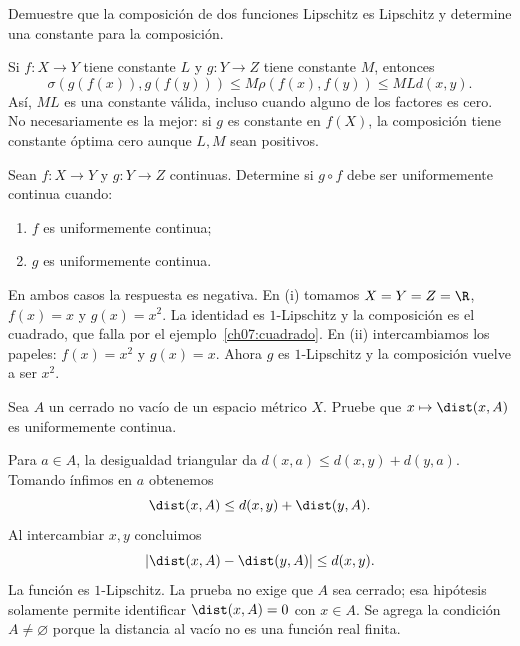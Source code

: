\begin{ejercicio}\label{ej:lectura-7-1}
Demuestre que la composición de dos funciones Lipschitz es Lipschitz y determine una constante para la composición.
\end{ejercicio}
\begin{solucion}
Si $f:X\to Y$ tiene constante $L$ y $g:Y\to Z$ tiene constante $M$, entonces
\[
 \sigma(g(f(x)),g(f(y)))\leq M\rho(f(x),f(y))\leq MLd(x,y).
\]
Así, $ML$ es una constante válida, incluso cuando alguno de los factores es cero. No necesariamente es la mejor: si $g$ es constante en $f(X)$, la composición tiene constante óptima cero aunque $L,M$ sean positivos.
\end{solucion}

\begin{ejercicio}\label{ej:lectura-7-2}
Sean $f:X\to Y$ y $g:Y\to Z$ continuas. Determine si $g\circ f$ debe ser uniformemente continua cuando: \begin{enumerate}[label=(\roman*)]
\item $f$ es uniformemente continua;
\item $g$ es uniformemente continua.
\end{enumerate}
\end{ejercicio}
\begin{solucion}
En ambos casos la respuesta es negativa. En (i) tomamos $X=Y=Z=\R$, $f(x)=x$ y $g(x)=x^2$. La identidad es $1$-Lipschitz y la composición es el cuadrado, que falla por el ejemplo~\ref{ch07:cuadrado}. En (ii) intercambiamos los papeles: $f(x)=x^2$ y $g(x)=x$. Ahora $g$ es $1$-Lipschitz y la composición vuelve a ser $x^2$.
\end{solucion}

\begin{ejercicio}\label{ej:lectura-7-3}
Sea $A$ un cerrado no vacío de un espacio métrico $X$. Pruebe que $x\mapsto\dist(x,A)$ es uniformemente continua.
\end{ejercicio}
\begin{solucion}
Para $a\in A$, la desigualdad triangular da $d(x,a)\leq d(x,y)+d(y,a)$. Tomando ínfimos en $a$ obtenemos
\[
 \dist(x,A)\leq d(x,y)+\dist(y,A).
\]
Al intercambiar $x,y$ concluimos
\[
 |\dist(x,A)-\dist(y,A)|\leq d(x,y).
\]
La función es $1$-Lipschitz. La prueba no exige que $A$ sea cerrado; esa hipótesis solamente permite identificar $\dist(x,A)=0$ con $x\in A$. Se agrega la condición $A\ne\varnothing$ porque la distancia al vacío no es una función real finita.
\end{solucion}

